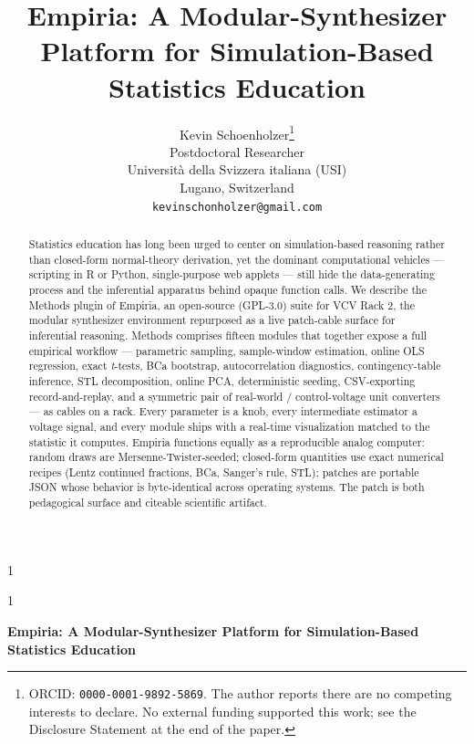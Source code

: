 \documentclass[12pt]{article}
\newcommand{\anon}{1}
\begin{document}
\def\spacingset#1{\renewcommand{\baselinestretch}{#1}\small\normalsize}
\spacingset{1}


\anon
{
  \title{\bf Empiria: A Modular-Synthesizer Platform for Simulation-Based Statistics Education}
  \author{Kevin Schoenholzer\thanks{ORCID: \texttt{0000-0001-9892-5869}. The author reports there are no competing interests to declare. No external funding supported this work; see the Disclosure Statement at the end of the paper.} \\
    Postdoctoral Researcher \\
    Universit\`a della Svizzera italiana (USI) \\
    Lugano, Switzerland \\
    \texttt{kevinschonholzer@gmail.com}}
  \maketitle
} \fi

\anon
{
  \bigskip
  \bigskip
  \bigskip
  \begin{center}
    {\LARGE\bf Empiria: A Modular-Synthesizer Platform for Simulation-Based Statistics Education}
  \end{center}
  \medskip
} \fi

\bigskip
\begin{abstract}
Statistics education has long been urged to center on simulation-based
reasoning rather than closed-form normal-theory derivation, yet the
dominant computational vehicles --- scripting in R or Python,
single-purpose web applets --- still hide the data-generating process
and the inferential apparatus behind opaque function calls. We describe
the Methods plugin of Empiria, an open-source (GPL-3.0) suite for VCV
Rack 2, the modular synthesizer environment repurposed as a live
patch-cable surface for inferential reasoning. Methods comprises fifteen
modules that together expose a full empirical workflow --- parametric
sampling, sample-window estimation, online OLS regression, exact
\textit{t}-tests, BCa bootstrap, autocorrelation diagnostics,
contingency-table inference, STL decomposition, online PCA,
deterministic seeding, CSV-exporting record-and-replay, and a symmetric
pair of real-world / control-voltage unit converters --- as cables on a
rack. Every parameter is a knob, every intermediate estimator a voltage
signal, and every module ships with a real-time visualization matched to
the statistic it computes. Empiria functions equally as a reproducible
analog computer: random draws are Mersenne-Twister-seeded; closed-form
quantities use exact numerical recipes (Lentz continued fractions, BCa,
Sanger's rule, STL); patches are portable JSON whose behavior is
byte-identical across operating systems. The patch is both pedagogical
surface and citeable scientific artifact.
\end{abstract}
\end{document}
